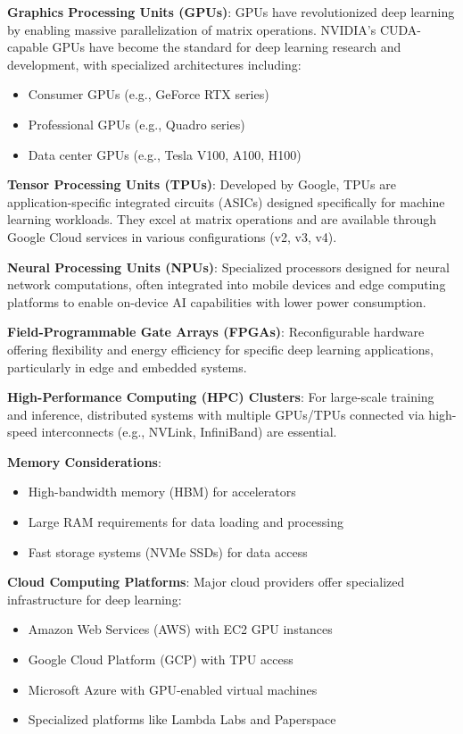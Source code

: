 \textbf{Graphics Processing Units (GPUs)}:
GPUs have revolutionized deep learning by enabling massive parallelization of matrix operations. NVIDIA's CUDA-capable GPUs have become the standard for deep learning research and development, with specialized architectures including:
\begin{itemize}
  \item Consumer GPUs (e.g., GeForce RTX series)
  \item Professional GPUs (e.g., Quadro series)
  \item Data center GPUs (e.g., Tesla V100, A100, H100)
\end{itemize}

\textbf{Tensor Processing Units (TPUs)}:
Developed by Google, TPUs are application-specific integrated circuits (ASICs) designed specifically for machine learning workloads. They excel at matrix operations and are available through Google Cloud services in various configurations (v2, v3, v4).

\textbf{Neural Processing Units (NPUs)}:
Specialized processors designed for neural network computations, often integrated into mobile devices and edge computing platforms to enable on-device AI capabilities with lower power consumption.

\textbf{Field-Programmable Gate Arrays (FPGAs)}:
Reconfigurable hardware offering flexibility and energy efficiency for specific deep learning applications, particularly in edge and embedded systems.

\textbf{High-Performance Computing (HPC) Clusters}:
For large-scale training and inference, distributed systems with multiple GPUs/TPUs connected via high-speed interconnects (e.g., NVLink, InfiniBand) are essential.

\textbf{Memory Considerations}:
\begin{itemize}
  \item High-bandwidth memory (HBM) for accelerators
  \item Large RAM requirements for data loading and processing
  \item Fast storage systems (NVMe SSDs) for data access
\end{itemize}

\textbf{Cloud Computing Platforms}:
Major cloud providers offer specialized infrastructure for deep learning:
\begin{itemize}
  \item Amazon Web Services (AWS) with EC2 GPU instances
  \item Google Cloud Platform (GCP) with TPU access
  \item Microsoft Azure with GPU-enabled virtual machines
  \item Specialized platforms like Lambda Labs and Paperspace
\end{itemize}

